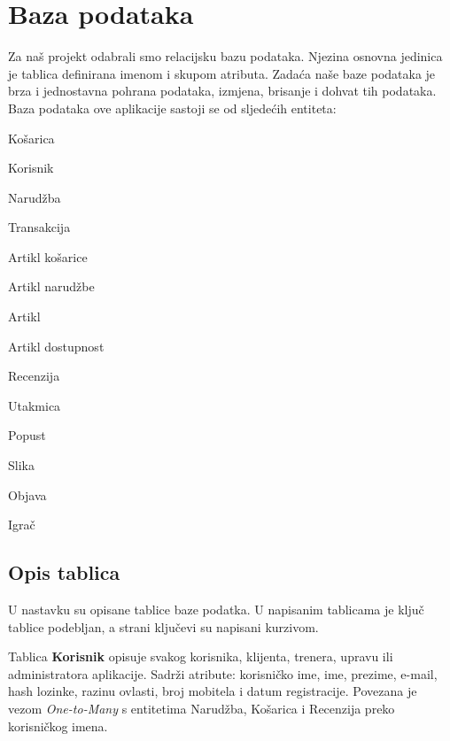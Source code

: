 	
		

		

				
		\section{Baza podataka}
			
			
		\textnormal{Za naš projekt odabrali smo relacijsku bazu podataka. Njezina osnovna jedinica je tablica definirana imenom i skupom atributa. Zadaća naše baze podataka je brza i jednostavna pohrana podataka, izmjena, brisanje i dohvat tih podataka. Baza podataka ove aplikacije sastoji se od sljedećih entiteta:}
		\smallbreak
			\begin{packed_item}
				\setlength\itemsep{0.01em}
			\item  Košarica
			\item  Korisnik
			\item  Narudžba
			\item Transakcija
			\item Artikl košarice
			\item Artikl narudžbe
			\item Artikl
			\item Artikl dostupnost
			\item Recenzija
			\item Utakmica
			\item Popust
			\item Slika
			\item Objava
			\item Igrač
		\end{packed_item}
		
		\pagebreak
		
			\subsection{Opis tablica}
			
				\textnormal{U nastavku su opisane tablice baze podatka. U napisanim tablicama je ključ tablice podebljan, a strani ključevi su napisani kurzivom.}
				
				\bigbreak

				\textnormal{Tablica \textbf{Korisnik} opisuje svakog korisnika, klijenta, trenera, upravu ili administratora aplikacije. Sadrži atribute: korisničko ime, ime, prezime, e-mail, hash lozinke, razinu ovlasti, broj mobitela i datum registracije. Povezana je vezom \textit{One-to-Many} s entitetima Narudžba, Košarica i Recenzija preko korisničkog imena.}
				
